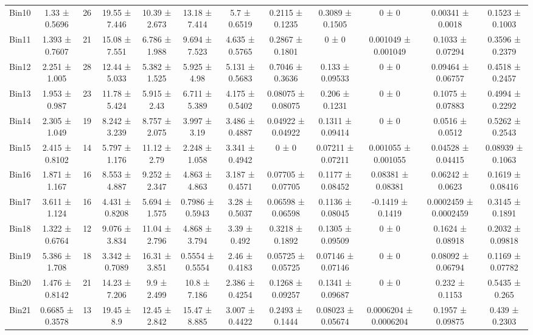 \begin{tabular}{@{\extracolsep{4pt}}lccccccccccc@{}}
     Bin10 & 1.33 ± 0.5696 & 26 & 19.55 ± 7.446 & 10.39 ± 2.673 & 13.18 ± 7.414 & 5.7 ± 0.6519 & 0.2115 ± 0.1235 & 0.3089 ± 0.1505 & 0 ± 0 & 0.00341 ± 0.0018 & 0.1523 ± 0.1003 \\ 
     Bin11 & 1.393 ± 0.7607 & 21 & 15.08 ± 7.551 & 6.786 ± 1.988 & 9.694 ± 7.523 & 4.635 ± 0.5765 & 0.2867 ± 0.1801 & 0 ± 0 & 0.001049 ± 0.001049 & 0.1033 ± 0.07294 & 0.3596 ± 0.2379 \\ 
     Bin12 & 2.251 ± 1.005 & 28 & 12.44 ± 5.033 & 5.382 ± 1.525 & 5.925 ± 4.98 & 5.131 ± 0.5683 & 0.7046 ± 0.3636 & 0.133 ± 0.09533 & 0 ± 0 & 0.09464 ± 0.06757 & 0.4518 ± 0.2457 \\ 
     Bin13 & 1.953 ± 0.987 & 23 & 11.78 ± 5.424 & 5.915 ± 2.43 & 6.711 ± 5.389 & 4.175 ± 0.5402 & 0.08075 ± 0.08075 & 0.206 ± 0.1231 & 0 ± 0 & 0.1075 ± 0.07883 & 0.4994 ± 0.2292 \\ 
     Bin14 & 2.305 ± 1.049 & 19 & 8.242 ± 3.239 & 8.757 ± 2.075 & 3.997 ± 3.19 & 3.486 ± 0.4887 & 0.04922 ± 0.04922 & 0.1311 ± 0.09414 & 0 ± 0 & 0.0516 ± 0.0512 & 0.5262 ± 0.2543 \\ 
     Bin15 & 2.415 ± 0.8102 & 14 & 5.797 ± 1.176 & 11.12 ± 2.79 & 2.248 ± 1.058 & 3.341 ± 0.4942 & 0 ± 0 & 0.07211 ± 0.07211 & 0.001055 ± 0.001055 & 0.04528 ± 0.04415 & 0.08939 ± 0.1063 \\ 
     Bin16 & 1.871 ± 1.167 & 16 & 8.553 ± 4.887 & 9.252 ± 2.347 & 4.863 ± 4.863 & 3.187 ± 0.4571 & 0.07705 ± 0.07705 & 0.1177 ± 0.08452 & 0.08381 ± 0.08381 & 0.06242 ± 0.0623 & 0.1619 ± 0.08416 \\ 
     Bin17 & 3.611 ± 1.124 & 16 & 4.431 ± 0.8208 & 5.694 ± 1.575 & 0.7986 ± 0.5943 & 3.28 ± 0.5037 & 0.06598 ± 0.06598 & 0.1136 ± 0.08045 & -0.1419 ± 0.1419 & 0.0002459 ± 0.0002459 & 0.3145 ± 0.1891 \\ 
     Bin18 & 1.322 ± 0.6764 & 12 & 9.076 ± 3.834 & 11.04 ± 2.796 & 4.868 ± 3.794 & 3.39 ± 0.492 & 0.3218 ± 0.1892 & 0.1305 ± 0.09509 & 0 ± 0 & 0.1624 ± 0.08918 & 0.2032 ± 0.09818 \\ 
     Bin19 & 5.386 ± 1.708 & 18 & 3.342 ± 0.7089 & 16.31 ± 3.851 & 0.5554 ± 0.5554 & 2.46 ± 0.4183 & 0.05725 ± 0.05725 & 0.07146 ± 0.07146 & 0 ± 0 & 0.08092 ± 0.06794 & 0.1169 ± 0.07782 \\ 
     Bin20 & 1.476 ± 0.8142 & 21 & 14.23 ± 7.206 & 9.9 ± 2.499 & 10.8 ± 7.186 & 2.386 ± 0.4254 & 0.1268 ± 0.09257 & 0.1341 ± 0.09687 & 0 ± 0 & 0.232 ± 0.1153 & 0.5435 ± 0.265 \\ 
     Bin21 & 0.6685 ± 0.3578 & 13 & 19.45 ± 8.9 & 12.45 ± 2.842 & 15.47 ± 8.885 & 3.007 ± 0.4422 & 0.2493 ± 0.1444 & 0.08023 ± 0.05674 & 0.0006204 ± 0.0006204 & 0.1957 ± 0.09875 & 0.439 ± 0.2303 \\ 

\end{tabular}
